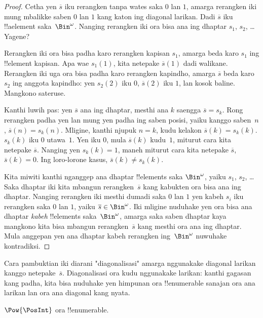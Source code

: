 \documentclass[../../../include/open-logic-section]{subfiles}
\begin{document}
\begin{proof}
Cetha yen $\overline{s}$ iku rerangken tanpa wates saka $0$ lan
$1$, amarga rerangken iki mung mbalikke saben $0$ lan $1$
kang katon ing diagonal larikan. Dadi $\overline{s}$
iku !!a{element} saka~$\Bin^\omega$. Nanging rerangken iki ora bisa
ana ing dhaptar $s_1$, $s_2$, \dots{} Yagene?

Rerangken iki ora bisa padha karo rerangken kapisan $s_1$,
amarga beda karo $s_1$ ing !!{element} kapisan. Apa wae $s_1(1)$,
kita netepake $\overline{s}(1)$ dadi walikane. Rerangken iki uga
ora bisa padha karo rerangken kapindho, amarga $\overline{s}$ beda karo
$s_2$ ing anggota kapindho: yen $s_2(2)$ iku $0$,
$\overline{s}(2)$ iku $1$, lan kosok baline. Mangkono sateruse.

Kanthi luwih pas: yen $\overline{s}$ ana ing dhaptar, mesthi ana
$k$ saengga $\overline{s} = s_{k}$. Rong rerangken padha
yen lan mung yen padha ing saben posisi, yaiku kanggo saben~$n$,
$\overline{s}(n) = s_{k}(n)$. Mligine, kanthi njupuk $n = k$,
kudu kelakon $\overline{s}(k) = s_{k}(k)$. $s_k(k)$ iku
$0$ utawa~$1$. Yen iku $0$, mula $\overline{s}(k)$ kudu~$1$,
miturut cara kita netepake $\overline{s}$. Nanging yen $s_k(k) = 1$,
maneh miturut cara kita netepake $\overline{s}$, $\overline{s}(k) = 0$.
Ing loro-lorone kasus, $\overline{s}(k) \neq s_{k}(k)$.

Kita miwiti kanthi nganggep ana dhaptar !!{element}s saka
$\Bin^\omega$, yaiku $s_1$, $s_2$, \dots{} Saka dhaptar iki kita
mbangun rerangken~$\overline{s}$ kang kabukten ora bisa ana ing dhaptar.
Nanging rerangken iki mesthi dumadi saka $0$ lan $1$ yen kabeh $s_i$
iku rerangken saka $0$ lan $1$, yaiku $\overline{s} \in
\Bin^\omega$. Iki mligine nuduhake yen ora bisa ana dhaptar
\emph{kabeh} !!{element}s saka~$\Bin^\omega$, amarga saka saben
dhaptar kaya mangkono kita bisa mbangun rerangken~$\overline{s}$
kang mesthi ora ana ing dhaptar. Mula anggepan yen ana dhaptar
kabeh rerangken ing~$\Bin^\omega$ nuwuhake kontradiksi.
\end{proof}

\begin{explain}
Cara pambuktian iki diarani "diagonalisasi" amarga nggunakake diagonal
larikan kanggo netepake~$\overline{s}$. Diagonalisasi ora kudu
nggunakake larikan: kanthi gagasan kang padha, kita bisa nuduhake
yen himpunan ora !!{enumerable} sanajan ora ana larikan
lan ora ana diagonal kang nyata.
\end{explain}

\begin{thm}
$\Pow{\PosInt}$ ora !!{enumerable}.
\end{thm}
\end{document}
